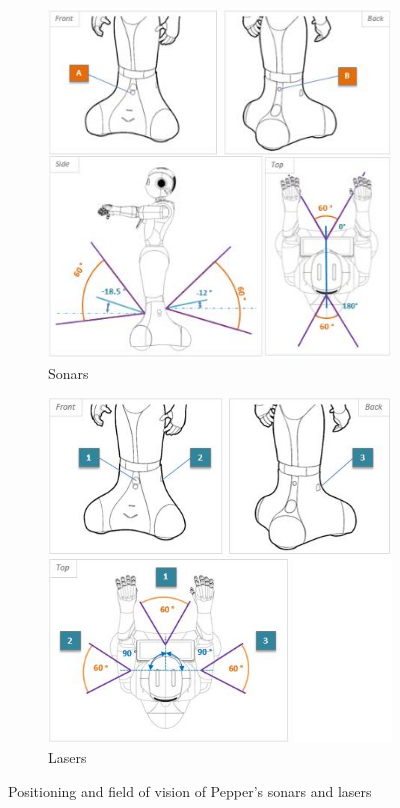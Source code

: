 \begin{figure}[H]
\centering
\begin{subfigure}{.5\textwidth}
  \centering
  \includegraphics[width=\linewidth]{Figures/Pepper_Robot/sonars.jpg}
  \caption{Sonars}
  \label{fig:sonars}
\end{subfigure}%
\begin{subfigure}{.5\textwidth}
  \centering
  \includegraphics[width=\linewidth]{Figures/Pepper_Robot/lasers.jpg}
  \caption{Lasers}
  \label{fig:lasers}
\end{subfigure}
\caption{Positioning and field of vision of Pepper's sonars and lasers}
\label{fig:sonars_lasers}
\end{figure}

